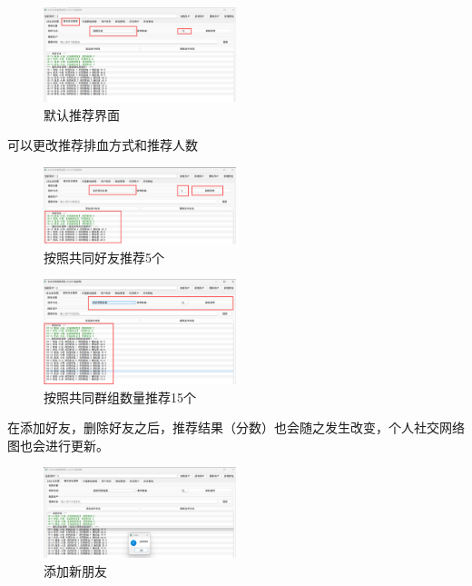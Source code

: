 \documentclass[12pt,a4paper]{article}
\begin{document}
\begin{figure}[H]
    \centering
    \includegraphics[width=0.5\textwidth]{pt2-14.png}
    \caption{默认推荐界面}
\end{figure}

可以更改推荐排血方式和推荐人数

\begin{figure}[H]
    \centering
    \includegraphics[width=0.5\textwidth]{pt2-15.png}
    \caption{按照共同好友推荐5个}
\end{figure}

\begin{figure}[H]
    \centering
    \includegraphics[width=0.5\textwidth]{pt2-16.png}
    \caption{按照共同群组数量推荐15个}
\end{figure}

在添加好友，删除好友之后，推荐结果（分数）也会随之发生改变，个人社交网络图也会进行更新。

\begin{figure}[H]
    \centering
    \includegraphics[width=0.5\textwidth]{pt2-17.png}
    \caption{添加新朋友}
\end{figure}
\end{document}
